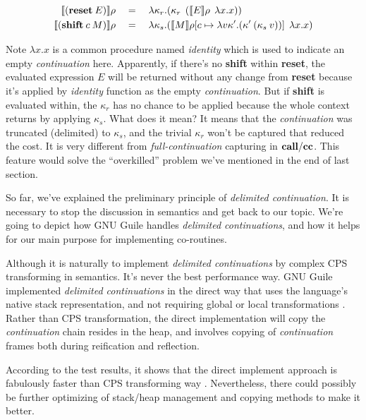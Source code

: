 \documentclass[numbers,numberedpars]{sigplanconf}
\begin{document}
\begin{align*}
  \llbracket{(\text{{\bf reset}}\:E)}\rrbracket\rho \quad&=\quad \lambda{\kappa_r}.(\kappa_r\:\: (\llbracket{E}\rrbracket\rho\:\: \lambda{x}.x))
  \\
  \llbracket{(\text{{\bf shift}}\:c\:M)}\rrbracket\rho \quad&=\quad
  \lambda{\kappa_s}.(\llbracket{M}\rrbracket\rho[c\mapsto\lambda{v\kappa'}.(\kappa'\:(\kappa_s\:v))]\:\:\lambda{x}.x)
\end{align*}

Note $\lambda{x}.x$ is a common procedure named {\it identity} which is used to indicate an empty {\it continuation} here.
Apparently, if there's no {\bf shift} within {\bf reset}, the evaluated expression $E$ will be returned without any change from {\bf reset} because
it's applied by {\it identity} function as the empty {\it continuation}. But if {\bf shift} is evaluated within, the $\kappa_r$ has no chance to
be applied because the whole context returns by applying $\kappa_s$. What does it mean? It means that the {\it continuation} was truncated (delimited) to
$\kappa_s$, and the trivial $\kappa_r$ won't be captured that reduced the cost. It is very different from {\it full-continuation} capturing in
${\bf call/cc}$. This feature would solve the ``overkilled'' problem we've mentioned in the end of last section.

So far, we've explained the preliminary principle of {\it delimited continuation}. It is necessary to stop the discussion in semantics and get back
to our topic. We're going to depict how GNU Guile handles {\it delimited continuations}, and how it helps for our main purpose for implementing
co-routines.

Although it is naturally to implement {\it delimited continuations} by complex CPS transforming in semantics. It's never the best performance way.
GNU Guile implemented {\it delimited continuations} in the direct way that uses the language's native stack representation, and not requiring global
or local transformations \citep{wingo2010}. Rather than CPS transformation, the direct implementation will copy the {\it continuation} chain resides in the
heap, and involves copying of {\it continuation} frames both during reification and reflection.

According to the test results, it shows that the direct implement approach is fabulously faster than CPS transforming way
\citep{Gasbichler:2002:FSC:581478.581504}. Nevertheless, there could possibly be further optimizing of stack/heap management and copying methods to make
it better.
\end{document}
